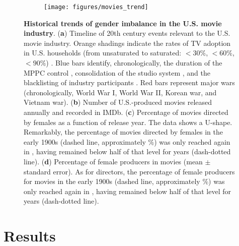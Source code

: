 \begin{figure}[t]
    \begin{subfigure}{0.7\textwidth}
        \texttt{[image: figures/movies\_trend]}
        \label{fig:movies:trend_a}
    \end{subfigure}
    \begin{subfigure}{0\textwidth}
        \label{fig:movies:trend_b}
    \end{subfigure}
    \begin{subfigure}{0\textwidth}
        \label{fig:movies:trend_c}
    \end{subfigure}
    \begin{subfigure}{0\textwidth}
        \label{fig:movies:trend_d}
    \end{subfigure}
\caption[Historical trends of gender imbalance in the U.S. movie industry.]{\textbf{Historical trends of gender imbalance in the U.S. movie industry}. (\textbf{a}) Timeline of 20th century events relevant to the U.S. movie industry. Orange shadings indicate the rates of TV adoption in U.S. households (from unsaturated to saturated: $<30\%$, $<60\%$, $<90\%$) \cite{Steinberg1980}. Blue bars identify, chronologically, the duration of the MPPC control \cite{Scott2005}, consolidation of the studio system \cite{Deutelbaum1989}, and the blacklisting of industry participants \cite{Buhle2004}. Red bars represent major wars (chronologically, World War I, World War II, Korean war, and Vietnam war). (\textbf{b}) Number of U.S.-produced movies released annually and recorded in IMDb. (\textbf{c}) Percentage of movies directed by females as a function of release year. The data shows a U-shape. Remarkably, the percentage of movies directed by females in the early 1900s (dashed line, approximately \dirEarlyMean{}\%) was only reached again in \dirYearRecover{}, having remained below half of that level for \dirYearsBelow{} years (dash-dotted line). (\textbf{d}) Percentage of female producers in movies (mean $\pm$ standard error). As for directors, the percentage of female producers for movies in the early 1900s (dashed line, approximately \prodEarlyMean{}\%) was only reached again in \prodYearRecover{}, having remained below half of that level for \prodYearsBelow{} years (dash-dotted line).}
\label{fig:movies:trend}
\end{figure}


\section{Results}

